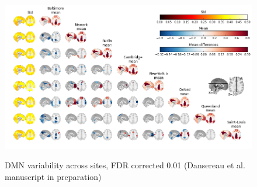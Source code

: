 \documentclass[authoryear]{elsarticle}
\begin{document}
\begin{figure}[t]
     \\
 \end{figure}
 


\begin{figure}[H]
\begin{center}
\includegraphics[width=\linewidth]{../figures/pccmap_multisite.png}
\end{center}
\tiny{DMN variability across sites, FDR corrected 0.01 (Dansereau et al. manuscript in preparation)
}
\end{figure}
\end{document}
